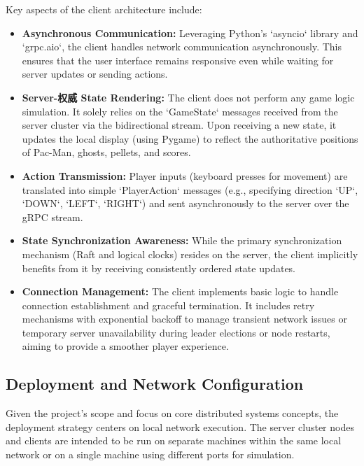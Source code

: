 \documentclass[11pt]{article}
\begin{document}
Key aspects of the client architecture include:
\begin{itemize}
    \item \textbf{Asynchronous Communication:} Leveraging Python's `asyncio` library and `grpc.aio`, the client handles network communication asynchronously. This ensures that the user interface remains responsive even while waiting for server updates or sending actions.
    \item \textbf{Server-权威 State Rendering:} The client does not perform any game logic simulation. It solely relies on the `GameState` messages received from the server cluster via the bidirectional stream. Upon receiving a new state, it updates the local display (using Pygame) to reflect the authoritative positions of Pac-Man, ghosts, pellets, and scores.
    \item \textbf{Action Transmission:} Player inputs (keyboard presses for movement) are translated into simple `PlayerAction` messages (e.g., specifying direction `UP`, `DOWN`, `LEFT`, `RIGHT`) and sent asynchronously to the server over the gRPC stream.
    \item \textbf{State Synchronization Awareness:} While the primary synchronization mechanism (Raft and logical clocks) resides on the server, the client implicitly benefits from it by receiving consistently ordered state updates.
    \item \textbf{Connection Management:} The client implements basic logic to handle connection establishment and graceful termination. It includes retry mechanisms with exponential backoff to manage transient network issues or temporary server unavailability during leader elections or node restarts, aiming to provide a smoother player experience.
\end{itemize}

\subsection{Deployment and Network Configuration}
Given the project's scope and focus on core distributed systems concepts, the deployment strategy centers on local network execution. The server cluster nodes and clients are intended to be run on separate machines within the same local network or on a single machine using different ports for simulation.
\end{document}
